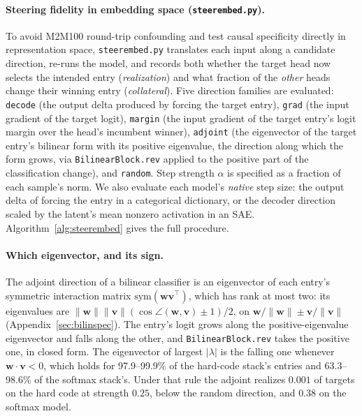 \paragraph{Steering fidelity in embedding space (\texttt{steerembed.py}).}
To avoid M2M100 round-trip confounding and test causal specificity directly
in representation space, \texttt{steerembed.py} translates each input along
a candidate direction, re-runs the model, and records both whether the
target head now selects the intended entry (\emph{realization}) and what
fraction of the \emph{other} heads change their winning entry
(\emph{collateral}). Five direction families are evaluated: \texttt{decode}
(the output delta produced by forcing the target entry), \texttt{grad} (the
input gradient of the target logit), \texttt{margin} (the input gradient of
the target entry's logit margin over the head's incumbent winner),
\texttt{adjoint} (the eigenvector of the target entry's bilinear form with
its positive eigenvalue, the direction along which the form grows, via
\texttt{BilinearBlock.rev} applied to the positive part of the
classification change), and \texttt{random}. Step strength $\alpha$ is
specified as a fraction of each sample's norm. We also evaluate each
model's \emph{native} step size: the output delta of forcing the entry in
a categorical dictionary, or the decoder direction scaled by the latent's
mean nonzero activation in an SAE. Algorithm~\ref{alg:steerembed} gives the full
procedure.



\paragraph{Which eigenvector, and its sign.}
\label{sec:eigorient}
The adjoint direction of a bilinear classifier is an eigenvector of each
entry's symmetric interaction matrix $\mathrm{sym}(\mathbf{w}\mathbf{v}^\top)$,
which has rank at most two: its eigenvalues are
$\lVert\mathbf{w}\rVert\lVert\mathbf{v}\rVert
(\cos\angle(\mathbf{w},\mathbf{v}) \pm 1)/2$, on
$\mathbf{w}/\lVert\mathbf{w}\rVert \pm \mathbf{v}/\lVert\mathbf{v}\rVert$
(Appendix~\ref{sec:bilinspec}). The entry's logit grows along the
positive-eigenvalue eigenvector and falls along the other, and
\texttt{BilinearBlock.rev} takes the positive one, in closed form. The
eigenvector of largest $\lvert\lambda\rvert$ is the falling one whenever
$\mathbf{w}\cdot\mathbf{v} < 0$, which holds for 97.9--99.9\% of the
hard-code stack's entries and 63.3--98.6\% of the softmax stack's. Under
that rule the adjoint realizes $0.001$ of targets on the hard code at
strength $0.25$, below the random direction, and $0.38$ on the softmax
model.

